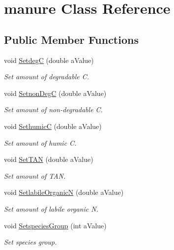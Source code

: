 \hypertarget{classmanure}{}\section{manure Class Reference}
\label{classmanure}
\subsection*{Public Member Functions}
\begin{DoxyCompactItemize}
\item 
void \mbox{\hyperlink{classmanure_a7f8c8e1b3d430985b9601c42d208bee0}{SetdegC}} (double a\+Value)
\begin{DoxyCompactList}\small\item\em Set amount of degradable C. \end{DoxyCompactList}\item 
void \mbox{\hyperlink{classmanure_a60f964b149055fba3bc3e5f6af4f3939}{Setnon\+DegC}} (double a\+Value)
\begin{DoxyCompactList}\small\item\em Set amount of non-\/degradable C. \end{DoxyCompactList}\item 
void \mbox{\hyperlink{classmanure_aa95701a43cd8787d8a1574732e56098a}{SethumicC}} (double a\+Value)
\begin{DoxyCompactList}\small\item\em Set amount of humic C. \end{DoxyCompactList}\item 
void \mbox{\hyperlink{classmanure_aaab1b791c9378e7e88c59a157916fa79}{Set\+T\+AN}} (double a\+Value)
\begin{DoxyCompactList}\small\item\em Set amount of T\+AN. \end{DoxyCompactList}\item 
void \mbox{\hyperlink{classmanure_af68a19d92a62f06032c80514e66d3b68}{Setlabile\+OrganicN}} (double a\+Value)
\begin{DoxyCompactList}\small\item\em Set amount of labile organic N. \end{DoxyCompactList}\item 
void \mbox{\hyperlink{classmanure_a5e54ba4bbadb3618b1c485d881f1b853}{Setspecies\+Group}} (int a\+Value)
\begin{DoxyCompactList}\small\item\em Set species group. \end{DoxyCompactList}\item 

\end{DoxyCompactItemize}
